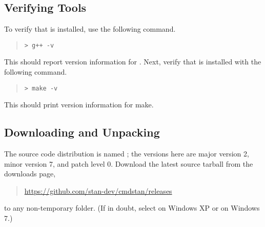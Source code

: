 \subsection{Verifying Tools}

To verify that \gpp is installed, use the following command.
%
\begin{quote}
  \Verb|> g++ -v|
\end{quote}
%
This should report version information for \gpp.  Next, verify that
 is installed with the following command.
%
\begin{quote}
  \Verb|> make -v|
\end{quote}
%
This should print version information for make.

\subsection{Downloading and Unpacking \CmdStan}

The \CmdStan source code distribution is named
; the versions here are major
version 2, minor version 7, and patch level 0.  Download the latest
\CmdStan source tarball from the \CmdStan downloads page,
%
\begin{quote}
\url{https://github.com/stan-dev/cmdstan/releases}
\end{quote}
%
to any non-temporary folder.  (If in doubt, select 
on Windows XP or  on Windows 7.)

